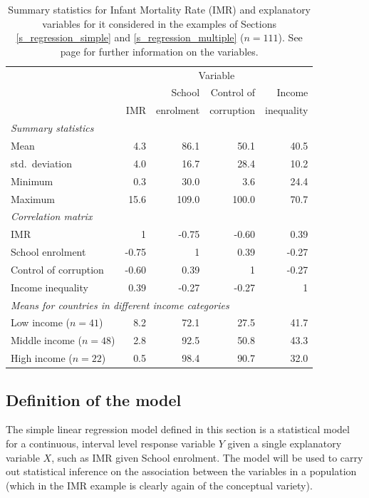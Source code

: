 \begin{table}
\caption{Summary statistics for Infant Mortality Rate (IMR) and
explanatory variables for it considered in the examples of Sections
\ref{s_regression_simple} and \ref{s_regression_multiple} ($n=111$). See
page \pageref{p_civilsoc} for further information on the variables.}
\label{t_imrvars}
\begin{center}
\begin{tabular}{|lrrrr|}\hline
& \multicolumn{4}{c|}{Variable} \\
& & School & Control of & Income \\
& IMR & enrolment & corruption & inequality  \\ \hline
\multicolumn{5}{l}{\emph{Summary statistics}} \\ \hline
Mean & 4.3 & 86.1 & 50.1 & 40.5 \\
std.\ deviation & 4.0 & 16.7 & 28.4 & 10.2 \\
Minimum & 0.3 & 30.0 & 3.6 & 24.4\\
Maximum & 15.6 & 109.0 & 100.0 & 70.7 \\ \hline
\multicolumn{5}{l}{\emph{Correlation matrix}} \\ \hline
IMR & 1& -0.75 & -0.60 & 0.39 \\
School enrolment & -0.75 & 1 & 0.39 & -0.27 \\
Control of corruption & -0.60 & 0.39 & 1& -0.27 \\
Income inequality & 0.39 & -0.27 & -0.27 & 1\\ \hline
\multicolumn{5}{l}{\emph{Means for countries in different income
categories}} \\ \hline
Low income ($n=41$)& 8.2& 72.1& 27.5 & 41.7\\
Middle income ($n=48$)& 2.8& 92.5& 50.8& 43.3\\
High income ($n=22$)& 0.5& 98.4& 90.7 & 32.0\\
\hline
\end{tabular}
\end{center}
\end{table}

\subsection{Definition of the model}
\label{ss_regression_simple_def}

The simple linear regression model defined in this section is a
statistical model for a continuous, interval level response
variable $Y$ given a single explanatory variable $X$, such as
IMR given School enrolment. The model will be used to carry out
statistical inference on the association between the variables in a
population (which in the IMR example is clearly again of the conceptual
variety).

